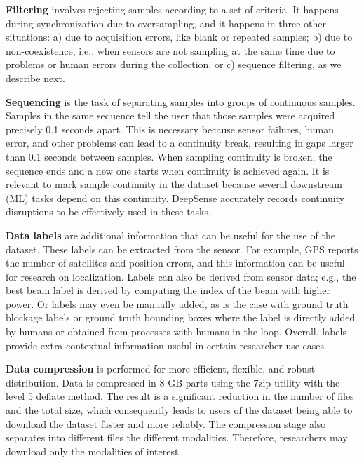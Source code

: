 \documentclass[10pt,comsoc]{IEEEtran}
\begin{document}
\textbf{Filtering} involves rejecting samples according to a set of criteria. It happens during synchronization due to oversampling, and it happens in three other situations: a) due to acquisition errors, like blank or repeated samples; b) due to non-coexistence, i.e., when sensors are not sampling at the same time due to problems or human errors during the collection, or c) sequence filtering, as we describe next. 

\textbf{Sequencing} is the task of separating samples into groups of continuous samples. Samples in the same sequence tell the user that those samples were acquired precisely 0.1 seconds apart. This is necessary because sensor failures, human error, and other problems can lead to a continuity break, resulting in gaps larger than 0.1 seconds between samples. When sampling continuity is broken, the sequence ends and a new one starts when continuity is achieved again. It is relevant to mark sample continuity in the dataset because several downstream (ML) tasks depend on this continuity. DeepSense accurately records continuity disruptions to be effectively used in these tasks.

\textbf{Data labels} are additional information that can be useful for the use of the dataset. These labels can be extracted from the sensor. For example, GPS reports the number of satellites and position errors, and this information can be useful for research on localization. Labels can also be derived from sensor data; e.g., the best beam label is derived by computing the index of the beam with higher power. Or labels may even be manually added, as is the case with ground truth blockage labels or ground truth bounding boxes where the label is directly added by humans or obtained from processes with humans in the loop. Overall, labels provide extra contextual information useful in certain researcher use cases.

\textbf{Data compression} is performed for more efficient, flexible, and robust distribution. Data is compressed in 8 GB parts using the 7zip utility with the level 5 deflate method. The result is a significant reduction in the number of files and the total size, which consequently leads to users of the dataset being able to download the dataset faster and more reliably. The compression stage also separates into different files the different modalities. Therefore, researchers may download only the modalities of interest. 
\end{document}

